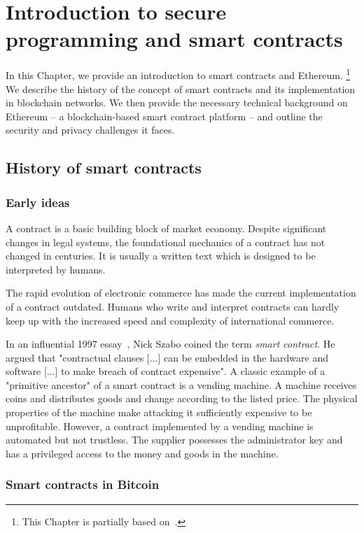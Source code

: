 \chapter{Introduction to secure programming and smart contracts}

\label{Chapter09Introcontracts}

In this Chapter, we provide an introduction to smart contracts and Ethereum.
\footnote{This Chapter is partially based on~\cite{Tikhomirov2017}.}
We describe the history of the concept of smart contracts and its implementation in blockchain networks.
We then provide the necessary technical background on Ethereum -- a blockchain-based smart contract platform -- and outline the security and privacy challenges it faces.


\section{History of smart contracts}

\subsection{Early ideas}

A contract is a basic building block of market economy.
Despite significant changes in legal systems, the foundational mechanics of a contract has not changed in centuries.
It is usually a written text which is designed to be interpreted by humans.

The rapid evolution of electronic commerce has made the current implementation of a contract outdated.
Humans who write and interpret contracts can hardly keep up with the increased speed and complexity of international commerce.

In an influential 1997 essay~\cite{Szabo1997}, Nick Szabo coined the term \textit{smart contract}.
He argued that "contractual clauses [...] can be embedded in the hardware and software [...] to make breach of contract expensive".
A classic example of a "primitive ancestor" of a smart contract is a vending machine.
A machine receives coins and distributes goods and change according to the listed price.
The physical properties of the machine make attacking it sufficiently expensive to be unprofitable.
However, a contract implemented by a vending machine is automated but not trustless.
The supplier possesses the administrator key and has a privileged access to the money and goods in the machine.


\subsection{Smart contracts in Bitcoin}

